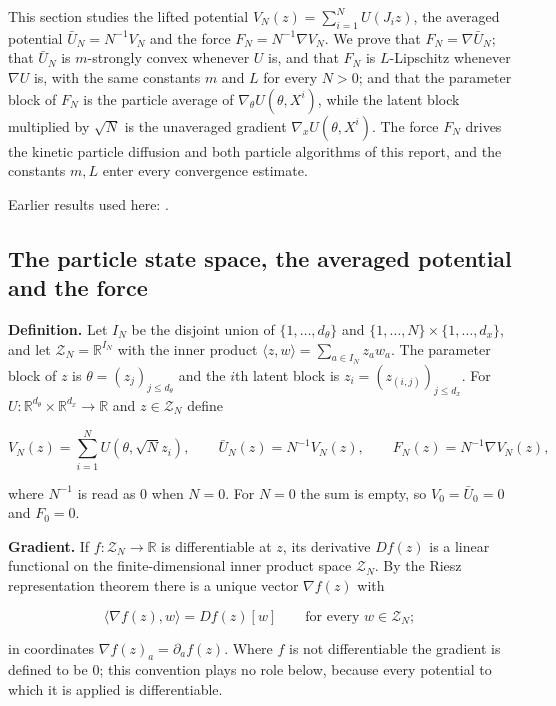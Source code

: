 \documentclass[11pt,a4paper]{report}
\begin{document}
This section studies the lifted potential \(V_N(z)=\sum_{i=1}^NU(J_iz)\), the averaged potential \(\bar U_N=N^{-1}V_N\) and the force \(F_N=N^{-1}\nabla V_N\). We prove that \(F_N=\nabla\bar U_N\); that \(\bar U_N\) is \(m\)-strongly convex whenever \(U\) is, and that \(F_N\) is \(L\)-Lipschitz whenever \(\nabla U\) is, with the same constants \(m\) and \(L\) for every \(N>0\); and that the parameter block of \(F_N\) is the particle average of \(\nabla_\theta U(\theta,X^i)\), while the latent block multiplied by \(\sqrt N\) is the unaveraged gradient \(\nabla_xU(\theta,X^i)\). The force \(F_N\) drives the kinetic particle diffusion and both particle algorithms of this report, and the constants \(m,L\) enter every convergence estimate.



Earlier results used here: \cite[Section~3.1]{LangevinLean2026IPLA}.
\subsection{\texorpdfstring{The particle state space, the averaged potential and the force}{The particle state space, the averaged potential and the force}}
\label{report-step-KIPLMC-Geometry-lean-1}


\textbf{Definition.} Let \(I_N\) be the disjoint union of \(\{1,\dots,d_\theta\}\) and \(\{1,\dots,N\}\times\{1,\dots,d_x\}\), and let \(\mathcal Z_N=\mathbb R^{I_N}\) with the inner product \(\langle z,w\rangle=\sum_{a\in I_N}z_aw_a\). The parameter block of \(z\) is \(\theta=(z_j)_{j\le d_\theta}\) and the \(i\)th latent block is \(z_i=(z_{(i,j)})_{j\le d_x}\). For \(U:\mathbb R^{d_\theta}\times\mathbb R^{d_x}\to\mathbb R\) and \(z\in\mathcal Z_N\) define


\[V_N(z)=\sum_{i=1}^NU(\theta,\sqrt Nz_i),\qquad\bar U_N(z)=N^{-1}V_N(z),\qquad F_N(z)=N^{-1}\nabla V_N(z),\]


where \(N^{-1}\) is read as \(0\) when \(N=0\). For \(N=0\) the sum is empty, so \(V_0=\bar U_0=0\) and \(F_0=0\).




\textbf{Gradient.} If \(f:\mathcal Z_N\to\mathbb R\) is differentiable at \(z\), its derivative \(Df(z)\) is a linear functional on the finite-dimensional inner product space \(\mathcal Z_N\). By the Riesz representation theorem there is a unique vector \(\nabla f(z)\) with


\[\langle\nabla f(z),w\rangle=Df(z)[w]\qquad\text{for every }w\in\mathcal Z_N;\]


in coordinates \(\nabla f(z)_a=\partial_af(z)\). Where \(f\) is not differentiable the gradient is defined to be \(0\); this convention plays no role below, because every potential to which it is applied is differentiable.
\end{document}
